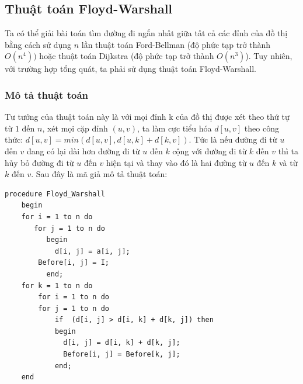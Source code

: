 \documentclass[a4paper,12pt]{report}
\begin{document}

\subsection{Thuật toán Floyd-Warshall}
	Ta có thể giải bài toán tìm đường đi ngắn nhất giữa tất cả các đỉnh của đồ thị bằng cách sử dụng  $n$ lần thuật toán Ford-Bellman (độ phức tạp trở thành $ O(n^{4})) $ hoặc thuật toán Dijkstra (độ phức tạp trở thành $ O(n^{3}) $). Tuy nhiên, với trường hợp tổng quát, ta phải sử dụng thuật toán Floyd-Warshall.

    \subsubsection{Mô tả thuật toán}
Tư tưởng của thuật toán này là với mọi đỉnh k của đồ thị được xét theo thứ tự từ $1$ đến $n$, xét mọi cặp đỉnh $ (u, v) $, ta làm cực tiểu hóa $ d[u, v] $ theo công thức: $ d[u, v] = min(d[u, v], d[u,k] + d[k, v]) $. Tức là nếu đường đi từ $u$ đến $v$ đang có lại dài hơn đường đi từ $u$ đến $k$ cộng với đường đi từ $k$ đến $v$ thì ta hủy bỏ đường đi từ $u$ đến $v$ hiện tại và thay vào đó là hai đường từ $u$ đến $k$ và từ $k$ đến $v$.
Sau đây là mã giả mô tả thuật toán:\\
\begin{verbatim}
procedure Floyd_Warshall
    begin
	for i = 1 to n do
	   for j = 1 to n do
	      begin
	        d[i, j] = a[i, j];
		Before[i, j] = I;
	      end;
	for k = 1 to n do
	    for i = 1 to n do
		for j = 1 to n do
		    if  (d[i, j] > d[i, k] + d[k, j]) then
			begin
			  d[i, j] = d[i, k] + d[k, j];
			  Before[i, j] = Before[k, j];
			end;
    end
\end{verbatim}
\end{document}
